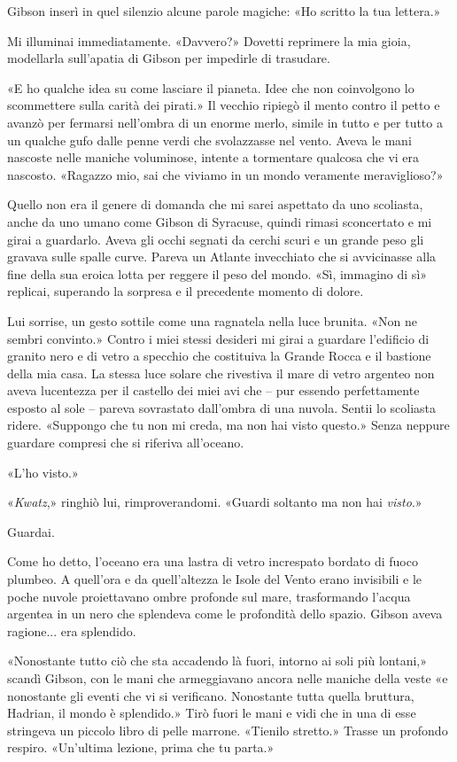 Gibson inserì in quel silenzio alcune parole magiche: «Ho scritto la tua
lettera.»

Mi illuminai immediatamente. «Davvero?» Dovetti reprimere la mia gioia,
modellarla sull'apatia di Gibson per impedirle di trasudare.

«E ho qualche idea su come lasciare il pianeta. Idee che non coinvolgono
lo scommettere sulla carità dei pirati.» Il vecchio ripiegò il mento
contro il petto e avanzò per fermarsi nell'ombra di un enorme merlo,
simile in tutto e per tutto a un qualche gufo dalle penne verdi che
svolazzasse nel vento. Aveva le mani nascoste nelle maniche voluminose,
intente a tormentare qualcosa che vi era nascosto. «Ragazzo mio, sai che
viviamo in un mondo veramente meraviglioso?»

Quello non era il genere di domanda che mi sarei aspettato da uno
scoliasta, anche da uno umano come Gibson di Syracuse, quindi rimasi
sconcertato e mi girai a guardarlo. Aveva gli occhi segnati da cerchi
scuri e un grande peso gli gravava sulle spalle curve. Pareva un Atlante
invecchiato che si avvicinasse alla fine della sua eroica lotta per
reggere il peso del mondo. «Sì, immagino di sì» replicai, superando la
sorpresa e il precedente momento di dolore.

Lui sorrise, un gesto sottile come una ragnatela nella luce brunita.
«Non ne sembri convinto.» Contro i miei stessi desideri mi girai a
guardare l'edificio di granito nero e di vetro a specchio che costituiva
la Grande Rocca e il bastione della mia casa. La stessa luce solare che
rivestiva il mare di vetro argenteo non aveva lucentezza per il castello
dei miei avi che -- pur essendo perfettamente esposto al sole -- pareva
sovrastato dall'ombra di una nuvola. Sentii lo scoliasta ridere.
«Suppongo che tu non mi creda, ma non hai visto questo.» Senza neppure
guardare compresi che si riferiva all'oceano.

«L'ho visto.»

«\emph{Kwatz},» ringhiò lui, rimproverandomi. «Guardi soltanto ma non
hai \emph{visto}.»

Guardai.

Come ho detto, l'oceano era una lastra di vetro increspato bordato di
fuoco plumbeo. A quell'ora e da quell'altezza le Isole del Vento erano
invisibili e le poche nuvole proiettavano ombre profonde sul mare,
trasformando l'acqua argentea in un nero che splendeva come le
profondità dello spazio. Gibson aveva ragione... era splendido.

«Nonostante tutto ciò che sta accadendo là fuori, intorno ai soli più
lontani,» scandì Gibson, con le mani che armeggiavano ancora nelle
maniche della veste «e nonostante gli eventi che vi si verificano.
Nonostante tutta quella bruttura, Hadrian, il mondo è splendido.» Tirò
fuori le mani e vidi che in una di esse stringeva un piccolo libro di
pelle marrone. «Tienilo stretto.» Trasse un profondo respiro. «Un'ultima
lezione, prima che tu parta.»

